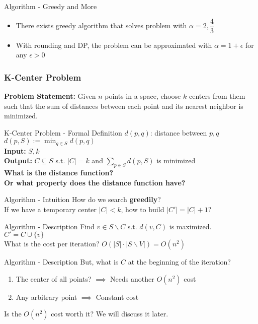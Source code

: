 \documentclass{beamer}
\newcommand*{\brk}{\\[10pt]}
\begin{document}
\begin{frame}{Algorithm - Greedy and More}
    \begin{itemize}
        \item There exists greedy algorithm that solves problem with $\alpha = 2, \dfrac{4}{3}$
        \item With rounding and DP, the problem can be approximated with $\alpha = 1 +\epsilon$ for any $\epsilon > 0$
    \end{itemize}
\end{frame}

\begin{frame}
    \frametitle{K-Center Problem}
    \textbf{Problem Statement:} Given $n$ points in a space, 
    choose $k$ centers from them such that the sum of distances between 
    each point and its nearest neighbor is minimized. 
\end{frame}

\begin{frame}{K-Center Problem - Formal Definition}
    $d(p, q)$: distance between $p, q$ \\ 
    $d(p, S) := \min_{q \in S} d(p, q)$ \\
    \textbf{Input:} $S, k$ \\
    \textbf{Output:} $C \subseteq S$ s.t. $|C| = k$ and  $\sum_{p \in S} d(p, S)$ 
    is minimized \\[20pt]
    \pause 
    \textbf{What is the distance function? \\ Or what property does the distance function have?}
\end{frame}


\begin{frame}{Algorithm - Intuition}
    How do we search \textbf{greedily}? \\[10pt]
    If we have a temporary center $|C| < k$, how to build $|C'| = |C| + 1$?
\end{frame}

\begin{frame}{Algorithm - Description}
    Find $v \in S \backslash C$ s.t. $d(v, C)$ is maximized. \brk
    $C' = C \cup \{v\}$ \brk
    \pause
    What is the cost per iteration? \pause $O(|S| \cdot |S \backslash V|) = O(n^2)$
\end{frame}

\begin{frame}{Algorithm - Description}
    But, what is $C$ at the beginning of the iteration? 
    \pause 
    \begin{enumerate}
        \item The center of all points? $\implies$ Needs another $O(n^2)$ cost 
        \item Any arbitrary point $\implies$ Constant cost
    \end{enumerate}
    \pause
    Is the $O(n^2)$ cost worth it? We will discuss it later.
\end{frame}
\end{document}
